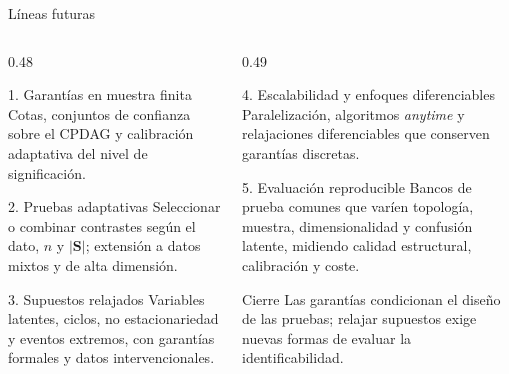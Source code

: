 \documentclass[aspectratio=169,11pt]{beamer}
\begin{document}
\begin{frame}[t]{Líneas futuras}
  \begin{columns}[T,onlytextwidth]
    \begin{column}{0.48\textwidth}
      \begin{block}{1. Garantías en muestra finita}
        \small Cotas, conjuntos de confianza sobre el CPDAG y calibración
        adaptativa del nivel de significación.
      \end{block}
      \begin{block}{2. Pruebas adaptativas}
        \small Seleccionar o combinar contrastes según el dato, $n$ y
        $|\mathbf S|$; extensión a datos mixtos y de alta dimensión.
      \end{block}
      \begin{block}{3. Supuestos relajados}
        \small Variables latentes, ciclos, no estacionariedad y eventos
        extremos, con garantías formales y datos intervencionales.
      \end{block}
    \end{column}
    \begin{column}{0.49\textwidth}
      \begin{block}{4. Escalabilidad y enfoques diferenciables}
        \small Paralelización, algoritmos \emph{anytime} y relajaciones
        diferenciables que conserven garantías discretas.
      \end{block}
      \begin{block}{5. Evaluación reproducible}
        \small Bancos de prueba comunes que varíen topología, muestra,
        dimensionalidad y confusión latente, midiendo calidad estructural,
        calibración y coste.
      \end{block}
      \begin{exampleblock}{Cierre}
        \small Las garantías condicionan el diseño de las pruebas; relajar
        supuestos exige nuevas formas de evaluar la identificabilidad.
      \end{exampleblock}
    \end{column}
  \end{columns}
\end{frame}
\end{document}
